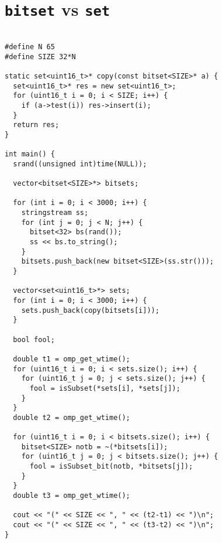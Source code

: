 \section{\texttt{bitset} vs \texttt{set}}
\label{app:setbench}
\begin{verbatim}

#define N 65
#define SIZE 32*N

static set<uint16_t>* copy(const bitset<SIZE>* a) {
  set<uint16_t>* res = new set<uint16_t>;
  for (uint16_t i = 0; i < SIZE; i++) {
    if (a->test(i)) res->insert(i);
  }
  return res;
}

int main() {
  srand((unsigned int)time(NULL));

  vector<bitset<SIZE>*> bitsets;

  for (int i = 0; i < 3000; i++) {
    stringstream ss;
    for (int j = 0; j < N; j++) {
      bitset<32> bs(rand());
      ss << bs.to_string();
    }
    bitsets.push_back(new bitset<SIZE>(ss.str()));
  }

  vector<set<uint16_t>*> sets;
  for (int i = 0; i < 3000; i++) {
    sets.push_back(copy(bitsets[i]));
  }

  bool fool;

  double t1 = omp_get_wtime();
  for (uint16_t i = 0; i < sets.size(); i++) {
    for (uint16_t j = 0; j < sets.size(); j++) {
      fool = isSubset(*sets[i], *sets[j]);
    }
  }
  double t2 = omp_get_wtime();

  for (uint16_t i = 0; i < bitsets.size(); i++) {
    bitset<SIZE> notb = ~(*bitsets[i]);
    for (uint16_t j = 0; j < bitsets.size(); j++) {
      fool = isSubset_bit(notb, *bitsets[j]);
    }
  }
  double t3 = omp_get_wtime();

  cout << "(" << SIZE << ", " << (t2-t1) << ")\n";
  cout << "(" << SIZE << ", " << (t3-t2) << ")\n";
}

\end{verbatim}

